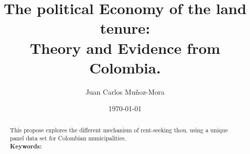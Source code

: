 \documentclass[11pt,a4paper,english]{amsart}
\begin{document}
\title[The political economy of the Land Tenure]{The political Economy of the land tenure: \\ Theory and Evidence from Colombia.}\singlespacing    
\author[Mu\~noz-Mora (2013)]{Juan Carlos Mu\~noz-Mora } 

\date{ \today}
\maketitle
\begin{abstract} \singlespacing    
This propose explores the different mechanism of rent-seeking thou, using a unique panel data set for Colombian municipalities. \\ 
 \textbf{Keywords:} 
\end{abstract}






\newpage
{} 
\end{document}
